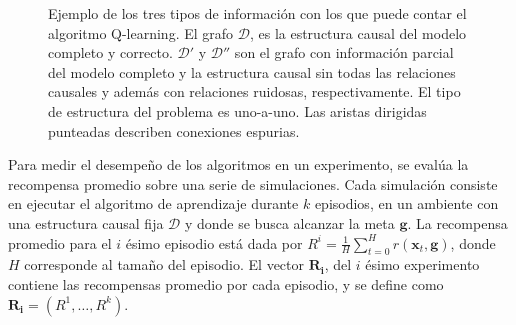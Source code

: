 \begin{figure}
  \centering
  \qquad
    \qquad
  \caption{Ejemplo de los tres tipos de información con los que puede contar el algoritmo Q-learning. El grafo $\mathcal{D}$, es la estructura causal del modelo completo y correcto. $\mathcal{D'}$ y $\mathcal{D''}$ son el grafo con información parcial del modelo completo y la estructura causal sin todas las relaciones causales y además con relaciones ruidosas, respectivamente. El tipo de estructura
  del problema es uno-a-uno. Las aristas dirigidas punteadas describen conexiones espurias.}
  \label{fig:types-info-dag}
\end{figure}

Para medir el desempeño de los algoritmos en un experimento, se evalúa la recompensa
promedio sobre una serie de simulaciones.
Cada simulación consiste en ejecutar el algoritmo de aprendizaje durante $k$ episodios, en 
un ambiente con una estructura causal fija $\mathcal{D}$ y donde se busca alcanzar la meta $\mathbf{g}$.
La recompensa promedio para el $i$ ésimo episodio está dada por
$R^{i} = \frac{1}{H}\sum_{t=0}^H r(\mathbf{x}_t, \mathbf{g})$,
donde $H$ corresponde al tamaño del episodio.
El vector $\mathbf{R_i}$, del $i$ ésimo experimento contiene las recompensas promedio por cada episodio, y se define como
$\mathbf{R_i} = (R^{1}, \dots, R^k)$.

